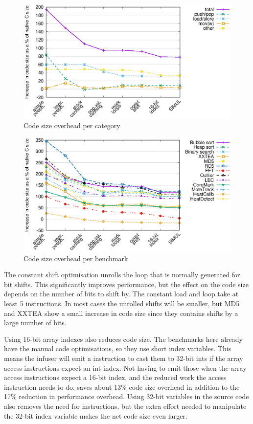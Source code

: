 \begin{figure}
\centering
\includegraphics[width=\mygraphsize]{codesizeoverhead-per-opcode-category.eps}
\caption{Code size overhead per category}
\label{fig-codesize-per-opcode-category}
\end{figure}

\begin{figure}
\centering
\includegraphics[width=\mygraphsize]{codesizeoverhead-per-benchmark.eps}
\caption{Code size overhead per benchmark}
\label{fig-codesize-per-benchmark}
\end{figure}

The constant shift optimisation unrolls the loop that is normally generated for bit shifts. This significantly improves performance, but the effect on the code size depends on the number of bits to shift by. The constant load and loop take at least 5 instructions. In most cases the unrolled shifts will be smaller, but MD5 and XXTEA show a small increase in code size since they contains shifts by a large number of bits.

Using 16-bit array indexes also reduces code size. The benchmarks here already have the manual code optimisations, so they use short index variables. This means the infuser will emit a  instruction to cast them to 32-bit ints if the array access instructions expect an int index. Not having to emit those when the array access instructions expect a 16-bit index, and the reduced work the access instruction needs to do, saves about 13\% code size overhead in addition to the 17\% reduction in performance overhead. Using 32-bit variables in the source code also removes the need for  instructions, but the extra effort needed to manipulate the 32-bit index variable makes the net code size even larger.

